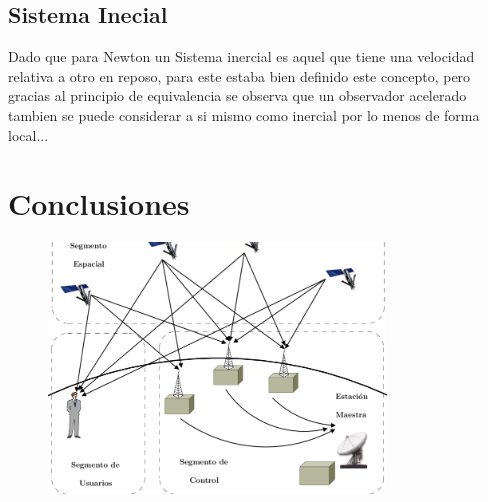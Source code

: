 \documentclass[12pt,twoside]{rif}
\begin{document}
	\subsection{Sistema Inecial}
	Dado que para Newton un Sistema inercial es aquel que tiene una velocidad relativa a otro en reposo, para este estaba bien definido este concepto, pero gracias al principio de equivalencia se observa que un observador acelerado tambien se puede considerar a si mismo como inercial por lo menos de forma local...
	\section{Conclusiones}
\begin{center}
\begin{figure}[h!]
\includegraphics[width=0.8\textwidth]{img/GPS.png}
\end{figure}
\end{center}
	\nocite{*}
	
	
	
\end{document}
